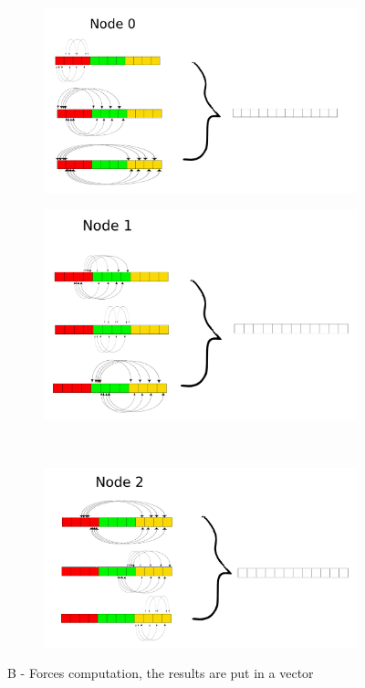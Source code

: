 \documentclass[a4paper]{article}
\begin{document}
\begin{figure}[ht]
\begin{subfigure}{.5\textwidth}
  \centering
  \includegraphics[width=1\linewidth]{force_calculation_0}
\end{subfigure} %
\begin{subfigure}{.5\textwidth}
  \centering
  \includegraphics[width=1\linewidth]{force_calculation_1}
\end{subfigure} \\ %
\begin{subfigure}{\textwidth}
  \centering
  \includegraphics[width=0.5\linewidth]{force_calculation_2}
\end{subfigure}
  \caption{B - Forces computation, the results are put in a vector}
  \label{fig:B2}
\end{figure}
\FloatBarrier
\end{document}
